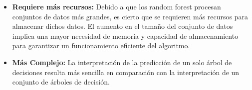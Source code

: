 \begin{itemize}
\begin{itemize}
        \item \textbf{Requiere más recursos:} Debido a que los random forest procesan conjuntos de datos más grandes, es cierto que se requieren más recursos para almacenar dichos datos. El aumento en el tamaño del conjunto de datos implica una mayor necesidad de memoria y capacidad de almacenamiento para garantizar un funcionamiento eficiente del algoritmo.    
        \item \textbf{Más Complejo:} La interpretación de la predicción de un solo árbol de decisiones resulta más sencilla en comparación con la interpretación de un conjunto de árboles de decisión.
    \end{itemize}
\end{itemize}